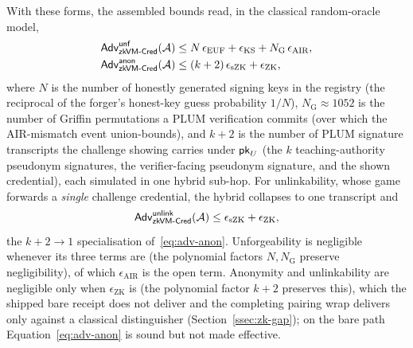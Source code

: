 With these forms, the assembled bounds read, in the classical random-oracle model,
\begin{align}
  \mathsf{Adv}^{\mathsf{unf}}_{\mathsf{zkVM\text{-}Cred}}(\mathcal{A})
  &\le N\,\epsilon_{\mathrm{EUF}} + \epsilon_{\mathrm{KS}}
       + N_{\mathrm{G}}\,\epsilon_{\mathrm{AIR}},
  \label{eq:adv-unf}\\
  \mathsf{Adv}^{\mathsf{anon}}_{\mathsf{zkVM\text{-}Cred}}(\mathcal{A})
  &\le (k+2)\,\epsilon_{\mathrm{sZK}} + \epsilon_{\mathrm{ZK}},
  \label{eq:adv-anon}
\end{align}
where $N$ is the number of honestly generated signing keys in the registry (the reciprocal of the forger's honest-key guess probability $1/N$), $N_{\mathrm G} \approx 1052$ is the number of Griffin permutations a PLUM verification commits (over which the AIR-mismatch event union-bounds), and $k+2$ is the number of PLUM signature transcripts the challenge showing carries under $\mathsf{pk}_U$ (the $k$ teaching-authority pseudonym signatures, the verifier-facing pseudonym signature, and the shown credential), each simulated in one hybrid sub-hop. For unlinkability, whose game forwards a \emph{single} challenge credential, the hybrid collapses to one transcript and
\begin{equation*}
  \mathsf{Adv}^{\mathsf{unlink}}_{\mathsf{zkVM\text{-}Cred}}(\mathcal{A})
  \le \epsilon_{\mathrm{sZK}} + \epsilon_{\mathrm{ZK}},
\end{equation*}
the $k+2\to1$ specialisation of~\eqref{eq:adv-anon}. Unforgeability is negligible whenever its three terms are (the polynomial factors $N,N_{\mathrm G}$ preserve negligibility), of which $\epsilon_{\mathrm{AIR}}$ is the open term. Anonymity and unlinkability are negligible only when $\epsilon_{\mathrm{ZK}}$ is (the polynomial factor $k+2$ preserves this), which the shipped bare receipt does not deliver and the completing pairing wrap delivers only against a classical distinguisher (Section~\ref{ssec:zk-gap}); on the bare path Equation~\eqref{eq:adv-anon} is sound but not made effective.

